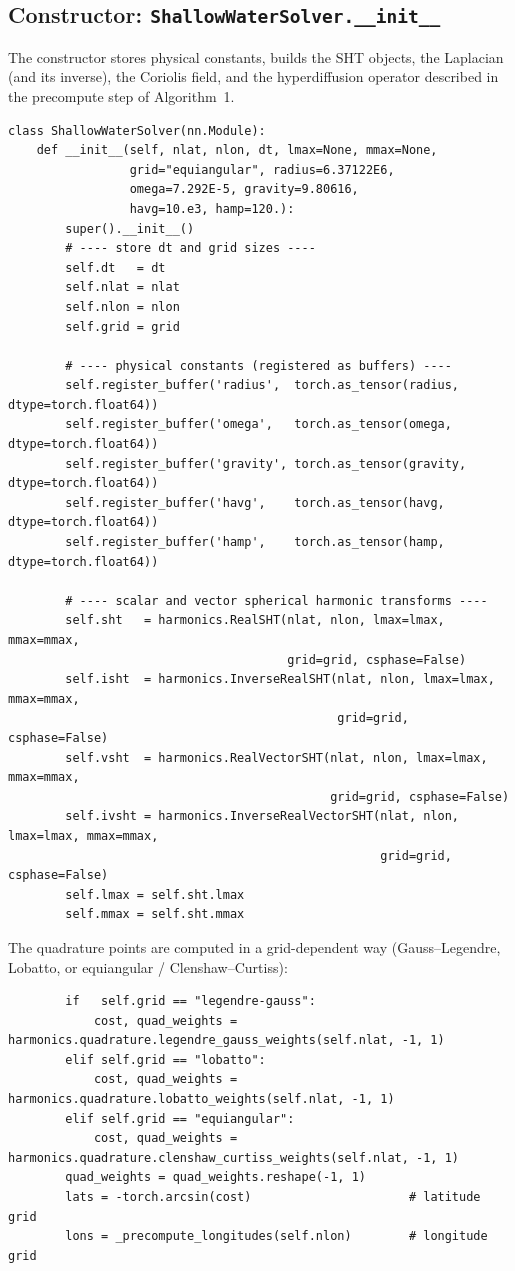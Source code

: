 \documentclass[11pt]{article}
\begin{document}
\subsection{Constructor: \texttt{ShallowWaterSolver.\_\_init\_\_}}

The constructor stores physical constants, builds the SHT objects,
the Laplacian (and its inverse), the Coriolis field, and the
hyperdiffusion operator described in the precompute step of
Algorithm~1.

\begin{lstlisting}
class ShallowWaterSolver(nn.Module):
    def __init__(self, nlat, nlon, dt, lmax=None, mmax=None,
                 grid="equiangular", radius=6.37122E6,
                 omega=7.292E-5, gravity=9.80616,
                 havg=10.e3, hamp=120.):
        super().__init__()
        # ---- store dt and grid sizes ----
        self.dt   = dt
        self.nlat = nlat
        self.nlon = nlon
        self.grid = grid

        # ---- physical constants (registered as buffers) ----
        self.register_buffer('radius',  torch.as_tensor(radius,  dtype=torch.float64))
        self.register_buffer('omega',   torch.as_tensor(omega,   dtype=torch.float64))
        self.register_buffer('gravity', torch.as_tensor(gravity, dtype=torch.float64))
        self.register_buffer('havg',    torch.as_tensor(havg,    dtype=torch.float64))
        self.register_buffer('hamp',    torch.as_tensor(hamp,    dtype=torch.float64))

        # ---- scalar and vector spherical harmonic transforms ----
        self.sht   = harmonics.RealSHT(nlat, nlon, lmax=lmax, mmax=mmax,
                                       grid=grid, csphase=False)
        self.isht  = harmonics.InverseRealSHT(nlat, nlon, lmax=lmax, mmax=mmax,
                                              grid=grid, csphase=False)
        self.vsht  = harmonics.RealVectorSHT(nlat, nlon, lmax=lmax, mmax=mmax,
                                             grid=grid, csphase=False)
        self.ivsht = harmonics.InverseRealVectorSHT(nlat, nlon, lmax=lmax, mmax=mmax,
                                                    grid=grid, csphase=False)
        self.lmax = self.sht.lmax
        self.mmax = self.sht.mmax
\end{lstlisting}

\noindent
The quadrature points are computed in a grid-dependent way
(Gauss--Legendre, Lobatto, or equiangular / Clenshaw--Curtiss):

\begin{lstlisting}
        if   self.grid == "legendre-gauss":
            cost, quad_weights = harmonics.quadrature.legendre_gauss_weights(self.nlat, -1, 1)
        elif self.grid == "lobatto":
            cost, quad_weights = harmonics.quadrature.lobatto_weights(self.nlat, -1, 1)
        elif self.grid == "equiangular":
            cost, quad_weights = harmonics.quadrature.clenshaw_curtiss_weights(self.nlat, -1, 1)
        quad_weights = quad_weights.reshape(-1, 1)
        lats = -torch.arcsin(cost)                      # latitude grid
        lons = _precompute_longitudes(self.nlon)        # longitude grid
\end{lstlisting}
\end{document}
